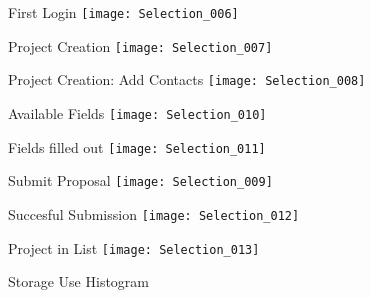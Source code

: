 \begin{frame}[c]{First Login}
    \texttt{[image: Selection\_006]}
\end{frame}

\begin{frame}[c]{Project Creation}
    \texttt{[image: Selection\_007]}
\end{frame}

\begin{frame}[c]{Project Creation: Add Contacts}
    \texttt{[image: Selection\_008]}
\end{frame}

\begin{frame}[c]{Available Fields}
    \texttt{[image: Selection\_010]}
\end{frame}

\begin{frame}[c]{Fields filled out}
    \texttt{[image: Selection\_011]}
\end{frame}

\begin{frame}[c]{Submit Proposal}
    \texttt{[image: Selection\_009]}
\end{frame}

\begin{frame}[c]{Succesful Submission}
    \texttt{[image: Selection\_012]}
\end{frame}

\begin{frame}[c]{Project in List}
    \texttt{[image: Selection\_013]}
\end{frame}

\begin{frame}[c]{Storage Use Histogram}
     \\
\end{frame}
